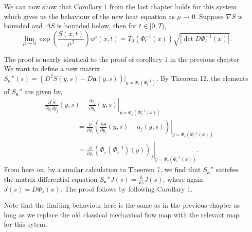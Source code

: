 \documentclass[a4paper,12pt,draft]{report}
\begin{document}
We can now show that Corollary 1 from the last chapter holds for this system which gives us the behaviour of the new heat equation as $\mu \to 0$.
\corollary
{
Suppose $\nabla S$ is bounded and $\Delta S$ is bounded below, then for $t \in [0, T)$,
$$
\lim_{\mu \to 0}\exp\left(\frac{S(x, t)}{\mu^2}\right)u^\mu(x, t) = T_0(\Phi_t^{-1}(x))\sqrt{|\det D\Phi_t^{-1}(x)|}.
$$
}
\proof
{
The proof is nearly identical to the proof of corollary 1 in the previous chapter.  We want to define a new matrix $S_\mathbf{a}''(s) = (D^2S(y, s) - D\mathbf{a}(y, s))|_{y = \Phi_s(\Phi_t^{-1})}$.  By Theorem 12, the elements of $S_\mathbf{a}''$ are given by,
\begin{align}
& \left.\frac{\partial^2 S}{\partial y_i \partial y_j}(y, s) - \frac{\partial a_j}{\partial y_i}(y, s)\right|_{y = \Phi_s(\Phi_t^{-1}(x))}\nonumber\\
& \hspace{2cm} = \left.\frac{\partial}{\partial y_i}\left(\frac{\partial S}{\partial y_j}(y, s) - a_j(y, s)\right)\right|_{y = \Phi_s(\Phi_t^{-1}(x))}\nonumber\\
& \hspace{2cm} = \left.\frac{\partial}{\partial y_i}\left(\dot{\Phi}_s(\Phi_s^{-1})(y)\right)_j\right|_{y = \Phi_s(\Phi_t^{-1}(x))}.\nonumber
\end{align}
From here on, by a similar calculation to Theorem 7, we find that $S_\mathbf{a}''$ satisfies the matrix differential equation $S_\mathbf{a}''J(s) = \frac{\mathrm{d}}{\mathrm{d}s}J(s)$, where again $J(s) = D\Phi_s(x)$.  The proof follows by following Corollary 1.

\qedhere
}

Note that the limiting behaviour here is the same as in the previous chapter as long as we replace the old classical mechanical flow map with the relevant map for this sytem.
\end{document}
